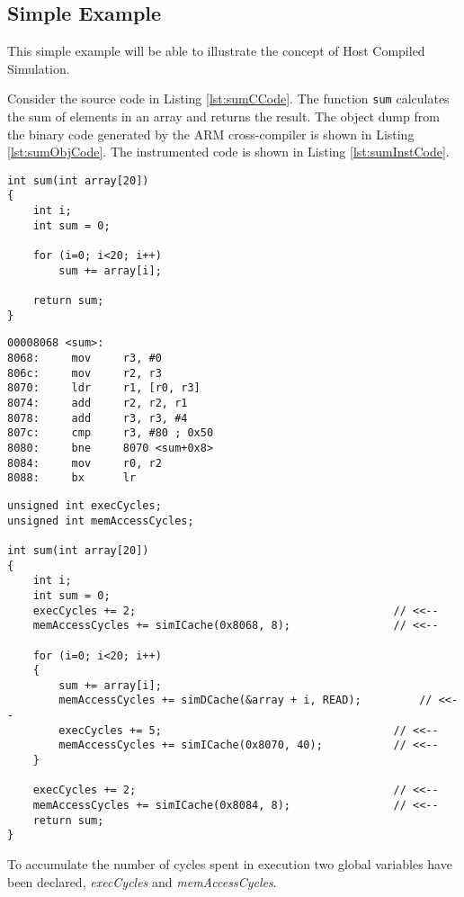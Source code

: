 \subsection{Simple Example}
This simple example will be able to illustrate the concept of Host Compiled Simulation.

Consider the source code in Listing \ref{lst:sumCCode}. The function \texttt{sum} calculates the sum of elements in an array and returns the result. The object dump from the binary code generated by the ARM cross-compiler is shown in Listing \ref{lst:sumObjCode}. The instrumented code is shown in Listing \ref{lst:sumInstCode}.

\begin{minipage}{0.5\textwidth}
\begin{lstlisting}[caption={Simple C Code},label={lst:sumCCode}]
int sum(int array[20])
{
	int i;
	int sum = 0;
	
	for (i=0; i<20; i++)
		sum += array[i];
	
	return sum;
}
\end{lstlisting}
\end{minipage}%
\begin{minipage}{0.5\textwidth}
\begin{lstlisting}[caption={Objdump Code},label={lst:sumObjCode}]
00008068 <sum>:
8068:     mov     r3, #0
806c:     mov     r2, r3
8070:     ldr     r1, [r0, r3]
8074:     add     r2, r2, r1
8078:     add     r3, r3, #4
807c:     cmp     r3, #80 ; 0x50
8080:     bne     8070 <sum+0x8>
8084:     mov     r0, r2
8088:     bx      lr
\end{lstlisting}
\end{minipage}

\begin{lstlisting}[caption={Instrumented Code},label={lst:sumInstCode}]
unsigned int execCycles;
unsigned int memAccessCycles;

int sum(int array[20])
{
	int i;
	int sum = 0;
	execCycles += 2;										// <<--
	memAccessCycles += simICache(0x8068, 8);				// <<--
	
	for (i=0; i<20; i++)
	{
		sum += array[i];
		memAccessCycles += simDCache(&array + i, READ);			// <<--
		execCycles += 5;									// <<--
		memAccessCycles += simICache(0x8070, 40);			// <<--
	}
	
	execCycles += 2;										// <<--
	memAccessCycles += simICache(0x8084, 8);				// <<--
	return sum;
}
\end{lstlisting}

To accumulate the number of cycles spent in execution two global variables have been declared, \textit{execCycles} and \textit{memAccessCycles}.


